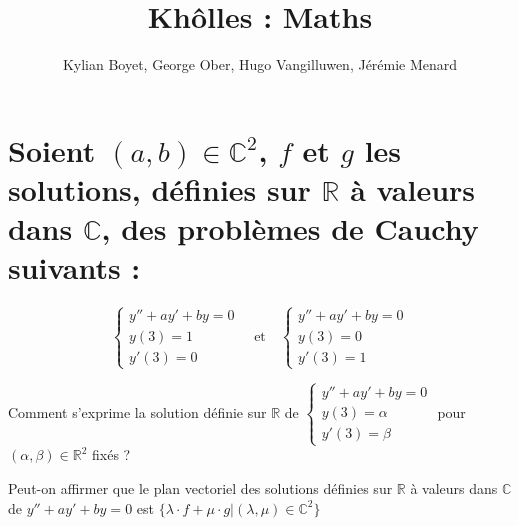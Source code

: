 \documentclass{article}
\title{Khôlles : Maths}
\author{Kylian Boyet, George Ober, Hugo Vangilluwen, Jérémie Menard}
\begin{document}
\maketitle

\section{Soient $(a,b)\in \mathbb{C}^2$, $f$ et $g$ les  solutions, définies sur $\mathbb{R}$ à valeurs
dans $\mathbb{C}$, des problèmes de Cauchy suivants :}


\[
    \left\{ \begin{array}{cl}
        y'' +ay'+by = 0 \\
        y(3) = 1\\
        y'(3) = 0
        \end{array} \right.        
	\quad \text{et} \quad
    \left\{ \begin{array}{cl}
        y'' +ay'+by = 0 \\
        y(3) = 0\\
        y'(3) = 1
        \end{array} \right.
\]

Comment s'exprime la solution définie sur $\mathbb{R}$ de $\left\{ \begin{array}{cl}
    y'' +ay'+by = 0 \\
    y(3) = \alpha \\
    y'(3) = \beta
    \end{array} \right. $ pour $(\alpha, \beta)\in \mathbb{R}^2$ fixés ? 

Peut-on affirmer que le plan vectoriel des solutions définies sur $\mathbb{R}$ à valeurs dans 
$\mathbb{C}$ de $y'' + ay' + by = 0$ est $\{ \lambda \cdot f + \mu \cdot g  | 
(\lambda, \mu)\in \mathbb{C}^2\}$
\end{document}
